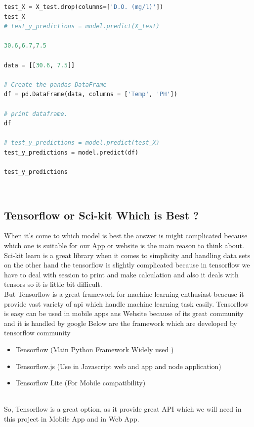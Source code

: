 \begin{lstlisting}[language=python, caption={ANN Model Tensorflow API}]
test_X = X_test.drop(columns=['D.O. (mg/l)'])
test_X
# test_y_predictions = model.predict(X_test)

30.6,6.7,7.5

data = [[30.6, 7.5]] 
  
# Create the pandas DataFrame 
df = pd.DataFrame(data, columns = ['Temp', 'PH']) 
  
# print dataframe. 
df

# test_y_predictions = model.predict(test_X)
test_y_predictions = model.predict(df)

test_y_predictions


\end{lstlisting}\\

\subsection{Tensorflow or Sci-kit Which is Best ?}

When it's come to which model is best the answer is might complicated because which one is suitable for our App or website is the main reason to think about.\\

Sci-kit learn is a great library when it comes to simplicity and handling data sets on the other hand the tensorflow is slightly complicated because in tensorflow we have to deal with session to print and make calculation and also it deals with tensors so it is little bit difficult.\\

But Tensorflow is a great framework for machine learning enthusiast beacuse it provide vast variety of api which handle machine learning task easily. Tensorflow is easy can be used in mobile apps ans Website because of its great community and it is handled by google Below are the framework which are developed by tensorflow community\\

\begin{itemize}
  \item Tensorflow (Main Python Framework Widely used )
  \item Tensorflow.js (Use in Javascript web and app and node application)
  \item Tensorflow Lite (For Mobile compatibility)
\end{itemize}\\

So, Tensorflow is a great option, as it provide great API which we will need in this project in Mobile App and in Web App.\\

